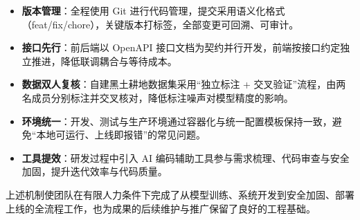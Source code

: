 \begin{itemize}
    \item \textbf{版本管理}：全程使用 Git 进行代码管理，提交采用语义化格式（feat/fix/chore），关键版本打标签，全部变更可回溯、可审计。
    \item \textbf{接口先行}：前后端以 OpenAPI 接口文档为契约并行开发，前端按接口约定独立推进，降低联调耦合与等待成本。
    \item \textbf{数据双人复核}：自建黑土耕地数据集采用“独立标注 + 交叉验证”流程，由两名成员分别标注并交叉核对，降低标注噪声对模型精度的影响。
    \item \textbf{环境统一}：开发、测试与生产环境通过容器化与统一配置模板保持一致，避免“本地可运行、上线即报错”的常见问题。
    \item \textbf{工具提效}：研发过程中引入 AI 编码辅助工具参与需求梳理、代码审查与安全加固，提升迭代效率与代码质量。
\end{itemize}

上述机制使团队在有限人力条件下完成了从模型训练、系统开发到安全加固、部署上线的全流程工作，也为成果的后续维护与推广保留了良好的工程基础。
